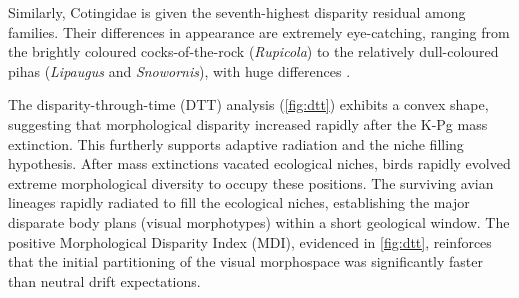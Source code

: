 Similarly, Cotingidae is given the seventh-highest disparity residual among families.
Their differences in appearance are extremely eye-catching, ranging from the
brightly coloured cocks-of-the-rock (\textit{Rupicola})
to the relatively dull-coloured pihas (\textit{Lipaugus} and \textit{Snowornis}),
with huge differences \parencite{Winkler2020Cotingas}.

The disparity-through-time (DTT) analysis (\cref{fig:dtt}) exhibits a convex shape,
suggesting that morphological disparity increased rapidly after the K-Pg mass extinction.
This furtherly supports  adaptive radiation and the niche filling hypothesis.
After mass extinctions vacated ecological niches,
birds rapidly evolved extreme morphological diversity to occupy these positions.
The surviving avian lineages rapidly radiated to fill the ecological niches,
establishing the major disparate body plans (visual morphotypes) within a short geological window.
The positive Morphological Disparity Index (MDI), evidenced in \cref{fig:dtt},
reinforces that the initial partitioning of the visual morphospace
was significantly faster than neutral drift expectations.